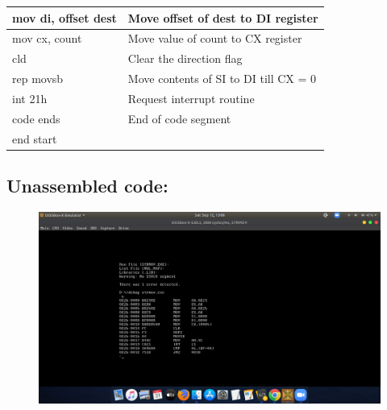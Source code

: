 \documentclass[12pt,a4paper]{article}
\begin{document}
\begin{flushleft}
\begin{table}[htb]
{\begin{tabular}{|l|l|}
\hline
mov di, offset dest                                              & Move offset of dest to DI register            \\ 
\hline
mov cx, count                                                    & Move value of count to CX register            \\ 
\hline
cld                                                              & Clear the direction flag                      \\
\hline
rep movsb                                                        & Move contents of SI to DI till CX = 0         \\
\hline
int 21h                                                          & Request interrupt routine                     \\ 
\hline
code ends                                                        & End of code segment                           \\
\hline
end start                                                        &                                               \\
\hline
\end{tabular}
}
\end{table}

\newpage
\subsection*{\textbf{Unassembled code:}}
\begin{figure}[h]
    \centering
    \includegraphics[trim = 100mm 60mm 200mm 120mm, clip, width = \textwidth]{Pics/StrmovUS.png}
\end{figure}

\end{flushleft}
\end{document}
